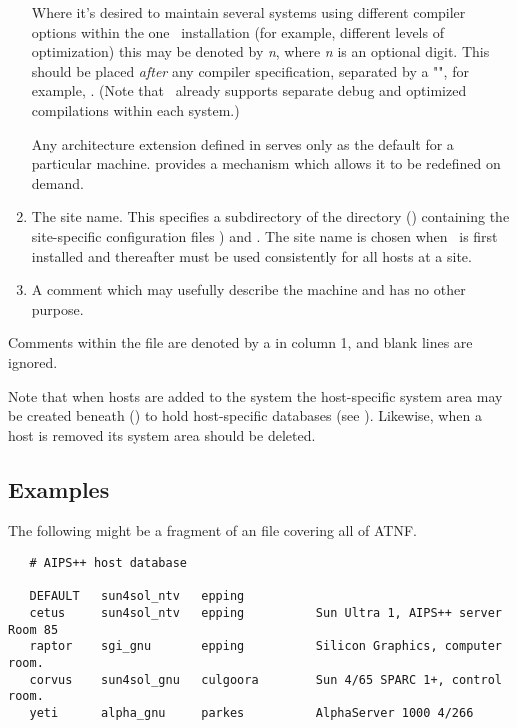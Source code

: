 \begin{enumerate}
\begin{itemize}
   \end{itemize}

   Where it's desired to maintain several systems using different compiler
   options within the one \aipspp\ installation (for example, different
   levels of optimization) this may be denoted by \textit{n}, where
   \textit{n} is an optional digit.  This should be placed {\em after} any
   compiler specification, separated by a "\code{-}", for example,
   .  (Note that \aipspp\ already supports separate
   debug and optimized compilations within each system.)

   Any architecture extension defined in  serves only as the
   default for a particular machine.   provides a mechanism
   which allows it to be redefined on demand.

\item
   The site name.  This specifies a subdirectory of the 
   directory () containing the site-specific configuration
   files ) and .  The site name is chosen when
   \aipspp\ is first installed and thereafter must be used consistently for
   all hosts at a site.

\item
   A comment which may usefully describe the machine and has no other purpose.

\end{enumerate}

\noindent
Comments within the  file are denoted by a \code{\#} in column
1, and blank lines are ignored.

Note that when hosts are added to the system the host-specific system area
may be created beneath  () to hold
host-specific databases (see ).  Likewise, when a host is
removed its system area should be deleted.

\subsection*{Examples}

The following might be a fragment of an  file covering all
of ATNF.

\begin{verbatim}
   # AIPS++ host database

   DEFAULT   sun4sol_ntv   epping
   cetus     sun4sol_ntv   epping          Sun Ultra 1, AIPS++ server Room 85
   raptor    sgi_gnu       epping          Silicon Graphics, computer room.
   corvus    sun4sol_gnu   culgoora        Sun 4/65 SPARC 1+, control room.
   yeti      alpha_gnu     parkes          AlphaServer 1000 4/266
\end{verbatim}

